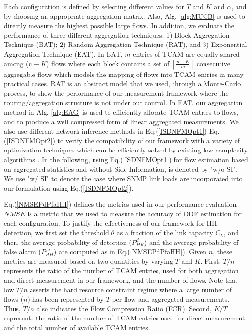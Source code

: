 Each configuration is defined by selecting different values for $T$ and $K$ and $\alpha$, and by choosing an appropriate aggregation matrix.  Also, Alg. \ref{alg:MUCB} is used to directly measure the highest possible large flows. In addition, we evaluate the performance of three different aggregation techniques: 1) Block Aggregation Technique (BAT); 2) Random Aggregation Technique (RAT), and 3) Exponential Aggregation Technique (EAT). In BAT, $m$ entries of TCAM are equally shared among ($n-K$) flows where each block contains a set of $\left\lceil \frac{n-K}{m} \right\rceil$ consecutive aggregable flows which models the mapping of flows into TCAM entries in many practical cases. RAT is an abstract model that we used, through a Monte-Carlo process, to show the performance of our measurement framework where the routing/aggregation structure is not under our control. In EAT, our aggregation method in Alg. \ref{alg:EAG} is used to efficiently allocate TCAM entries to flows, and to produce a well compressed form of linear aggregated measurements. We also use different network inference methods in Eq.(\ref{ISDNFMOpt1})-Eq.(\ref{ISDNFMOpt2}) to verify the compatibility of our framework with a variety of optimization techniques which can be efficiently solved by existing low-complexity algorithms \cite{YCEldar:2012}. In the following, using Eq.(\ref{ISDNFMOpt1}) for flow estimation based on aggregated statistics and without Side Information, is denoted by "w/o SI". We use "w/ SI" to denote the case where SNMP link loads are incorporated into our formulation using Eq.(\ref{ISDNFMOpt2}).

Eq.(\ref{NMSEPdPfaHH}) defines the metrics used in our performance evaluation. $NMSE$ is a metric that we used to measure the accuracy of ODF estimation for each configuration. To justify the effectiveness of our framework for HH detection, we first set the threshold $\theta$ as a fraction of the link capacity $C_{L}$, and then, the average probability of detection ($P_{HH}^{d}$) and the average probability of false alarm ($P_{HH}^{fa}$) are computed as in Eq.(\ref{NMSEPdPfaHH}). Given $n$, these metrics are measured based on two quantities by varying $T$ and $K$. First, $T/n$ represents the ratio of the number of TCAM entries, used for both aggregation and direct measurement in our framework, and the number of flows. Note that low $T/n$ asserts the hard resource constraint regime where a large number of flows ($n$) has been represented by $T$ per-flow and aggregated measurements. Thus, $T/n$ also indicates the Flow Compression Ratio (FCR). Second, $K/T$ represents the ratio of the number of TCAM entries used for direct measurement and the total number of available TCAM entries. 

